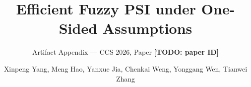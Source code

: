\documentclass[nonacm,sigconf]{acmart}
\newcommand{\PaperID}{\textbf{[TODO: paper ID]}}
\begin{document}
\title{Efficient Fuzzy PSI under One-Sided Assumptions}
\subtitle{Artifact Appendix --- CCS 2026, Paper \PaperID}
\author{Xinpeng Yang, Meng Hao, Yanxue Jia, Chenkai Weng, Yonggang Wen, Tianwei Zhang}
\renewcommand{\shortauthors}{Yang et al.}
\maketitle
\appendix

\end{document}
